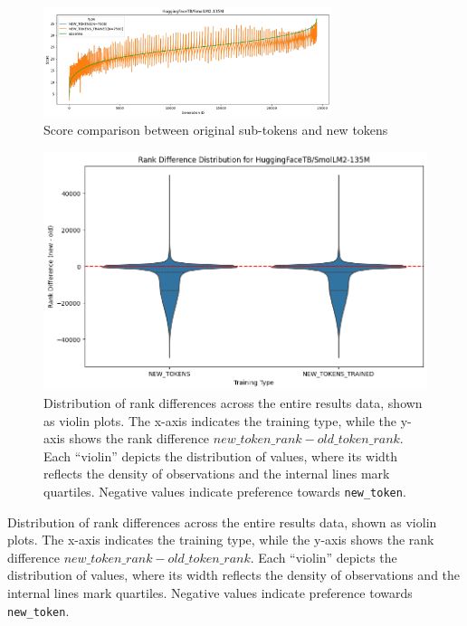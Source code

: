 \begin{figure}[H]
    \centering
    \includegraphics[width=0.75\textwidth]{Figures/rank_distribution_smolLM2.png}
    \caption[Score comparison]{Score comparison between original sub-tokens and new tokens\footnotemark}
    \label{fig:new_token_rank}
\end{figure}

\begin{figure}[H]
    \centering
    \includegraphics[width=1\textwidth]{Figures/rank_diff_dist_violin.png}
    \caption[Distribution of Rank Differences]{Distribution of rank differences across the entire results data, shown as violin plots. The x-axis indicates the training type, while the y-axis shows the rank difference $new\_token\_rank - old\_token\_rank$. Each “violin” depicts the distribution of values, where its width reflects the density of observations and the internal lines mark quartiles. 
Negative values indicate preference towards \texttt{new\_token}.}
    \label{fig:violin_rank_dist}
\end{figure}
Distribution of rank differences across the entire results data, shown as violin plots. 
The x-axis indicates the training type, while the y-axis shows the rank difference $new\_token\_rank - old\_token\_rank$. 
Each “violin” depicts the distribution of values, where its width reflects the density of observations and the internal lines mark quartiles. 
Negative values indicate preference towards \texttt{new\_token}.


